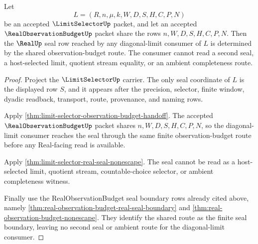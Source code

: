 \begin{theorem}
\label{thm:limit-selector-shared-budget-real-seal-determinacy}
Let
$$
L=(R,n,\mu,k,W,D,S,H,C,P,N)
$$
be an accepted $\LimitSelectorUp$ packet, and let an accepted $\RealObservationBudgetUp$ packet share the rows $n,W,D,S,H,C,P,N$. Then the $\RealUp$ seal row reached by any diagonal-limit consumer of $L$ is determined by the shared observation-budget route. The consumer cannot read a second seal, a host-selected limit, quotient stream equality, or an ambient completeness route.
\end{theorem}
\begin{proof}
Project the $\LimitSelectorUp$ carrier. The only seal coordinate of $L$ is the displayed row $S$, and it appears after the precision, selector, finite window, dyadic readback, transport, route, provenance, and naming rows.

Apply \autoref{thm:limit-selector-observation-budget-handoff}. The accepted $\RealObservationBudgetUp$ packet shares $n,W,D,S,H,C,P,N$, so the diagonal-limit consumer reaches the seal through the same finite observation-budget route before any Real-facing read is available.

Apply \autoref{thm:limit-selector-real-seal-nonescape}. The seal cannot be read as a host-selected limit, quotient stream, countable-choice selector, or ambient completeness witness.

Finally use the RealObservationBudget seal boundary rows already cited above, namely \autoref{thm:real-observation-budget-real-seal-boundary} and \autoref{thm:real-observation-budget-nonescape}. They identify the shared route as the finite seal boundary, leaving no second seal or ambient route for the diagonal-limit consumer.
\end{proof}

